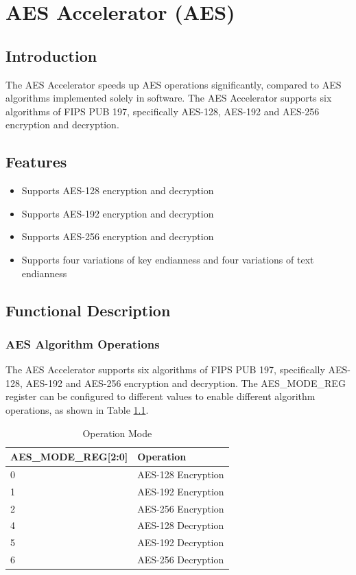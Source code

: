 \documentclass[main\_\_EN.tex]{subfiles}
\begin{document}
\hypertarget{aes}{}
\chapter{AES Accelerator (AES)}
\label{mod:aes}

\section{Introduction}

The AES Accelerator speeds up AES operations significantly, compared to AES algorithms implemented solely in software. The AES Accelerator supports six algorithms of FIPS PUB 197, specifically AES-128, AES-192 and AES-256 encryption and decryption.

\section{Features}

\begin{itemize}
    \item Supports AES-128 encryption and decryption
    \item Supports AES-192 encryption and decryption
    \item Supports AES-256 encryption and decryption
    \item Supports four variations of key endianness and four variations of text endianness
\end{itemize}

\section{Functional Description}

\subsection{AES Algorithm Operations}

The AES Accelerator supports six algorithms of FIPS PUB 197, specifically AES-128, AES-192 and AES-256 encryption and decryption. The AES\_MODE\_REG register can be configured to different values to enable different algorithm operations, as shown in Table \ref{table:AESOperation}.
\begin{longtable}[c]{ |p{7cm}|p{8cm}| }
\caption{Operation Mode} \label{table:AESOperation} \\
\hline \rowcolor{lightgray}
AES\_MODE\_REG[2:0]     & Operation\\\hline
    0                       & AES-128 Encryption    \\ \hline
    1                       & AES-192 Encryption    \\ \hline
    2                       & AES-256 Encryption    \\ \hline
    4                       & AES-128 Decryption    \\ \hline
    5                       & AES-192 Decryption    \\ \hline
    6                       & AES-256 Decryption    \\ \hline
\end{longtable}
\end{document}
